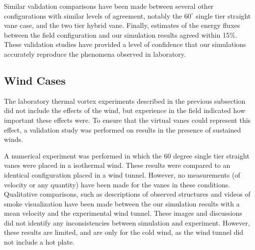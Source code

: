 Similar validation comparisons have been made between several other
configurations with similar levels of agreement,  notably the
$60^{\circ}$ single tier straight vane case, and the two tier hybrid
vane.  Finally, estimates of the energy fluxes between the field
configuration and our simulation results agreed within 15\%. These
validation studies have provided a level of confidence that our
simulations accurately reproduce the phenomena observed in laboratory.

\subsection{Wind Cases}

The laboratory thermal vortex experiments described in the previous
subsection did not include the effects of the wind, but experience in
the field indicated how important these effects were. To ensure that the
virtual vanes could represent this effect, a validation study 
was performed on results in the presence of sustained winds. 

A numerical experiment was performed in which the 60 degree single tier
straight vanes were placed in a isothermal wind.  These results were
compared to an identical configuration placed in a wind tunnel.
However, no measurements (of velocity or any quantity) have been made
for the vanes in these conditions. Qualitative comparisons, such as
descriptions of observed structures and videos of smoke visualization
have been made between the our simulation results with a mean velocity
and the experimental wind tunnel. These images and discussions did not
identify any inconsistencies between simulation and experiment.
However, these results are limited, and are only for the cold wind, as
the wind tunnel did not include a hot plate.  

